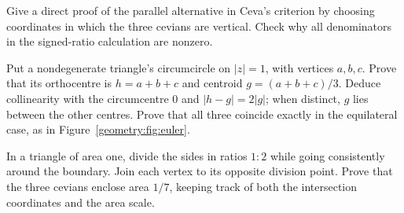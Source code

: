 \begin{exercise}[$\star$]\label{geometry:ex:cevaparallel}
Give a direct proof of the parallel alternative in Ceva's criterion by choosing coordinates in which the three cevians are vertical. Check why all denominators in the signed-ratio calculation are nonzero.
\end{exercise}
\begin{exercise}[$\star\star$]\label{geometry:ex:eulerline}
Put a nondegenerate triangle's circumcircle on $|z|=1$, with vertices $a,b,c$. Prove that its orthocentre is $h=a+b+c$ and centroid $g=(a+b+c)/3$. Deduce collinearity with the circumcentre $0$ and $|h-g|=2|g|$; when distinct, $g$ lies between the other centres. Prove that all three coincide exactly in the equilateral case, as in Figure~\ref{geometry:fig:euler}.
\end{exercise}
\begin{exercise}[$\star\star$]\label{geometry:ex:routh}
In a triangle of area one, divide the sides in ratios $1:2$ while going consistently around the boundary. Join each vertex to its opposite division point. Prove that the three cevians enclose area $1/7$, keeping track of both the intersection coordinates and the area scale.
\end{exercise}

